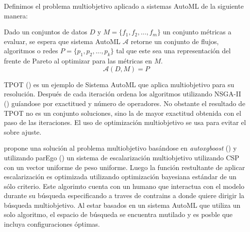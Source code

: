 Definimos el problema multiobjetivo aplicado a sistemas AutoML de la siguiente manera:
\begin{definition}\label{proposal:moo-automl-problem}
    Dado un conjuntos de datos $D$ y  $M = \{f_1, f_2, ...,f_m\}$ un conjunto m\'etricas a evaluar, se espera que sistema AutoML $\mathcal{A}$ retorne un conjunto de flujos, algoritmos o redes $P = \{p_1, p_2, ..., p_k\}$ tal que este sea una representaci\'on del frente de Pareto al optimizar para las m\'etricas en $M$.
    \begin{equation*}
        \mathcal{A}(D, M) = P  
    \end{equation*}
\end{definition}

TPOT (\cite{pmlr-v64-olson_tpot_2016}) es un ejemplo de Sistema AutoML que aplica multiobjetivo para su resoluci\'on. Despu\'es de cada iteraci\'on ordena los algoritmos utilizando NSGA-II (\cite{deb2002fast}) gu\'iandose por exactitued y n\'umero de operadores. No obstante el resultado de TPOT no es un conjunto soluciones, sino la de mayor exactitud obtenida con el paso de las iteraciones. El uso de optimizaci\'on multiobjetivo se usa para evitar el sobre ajuste.

\cite{pfisterer2019multi} propone una soluci\'on al problema multiobjetivo bas\'andose en \textit{autoxgboost} (\cite{thomas2018automatic}) y utilizando  parEgo (\cite{knowles2006parego}) un sistema de escalarizaci\'on multiobjetivo utilizando CSP con un vector uniforme de peso uniforme. Luego la funci\'on restultante de aplicar escalarizaci\'on es optimizada utilizando optimizaci\'on bayesiana est\'andar de un s\'olo criterio.
Este algorimto cuenta con un humano que interactua con el modelo durante su b\'usqueda especificando a traves de contrains a donde quiere dirigir la b\'usqueda multiobjetivo.
Al estar basados en un sistema AutoML que utiliza un solo algoritmo, el espacio de b\'usqueda se encuentra mutilado y es posble que incluya configuraciones \'optimas.




